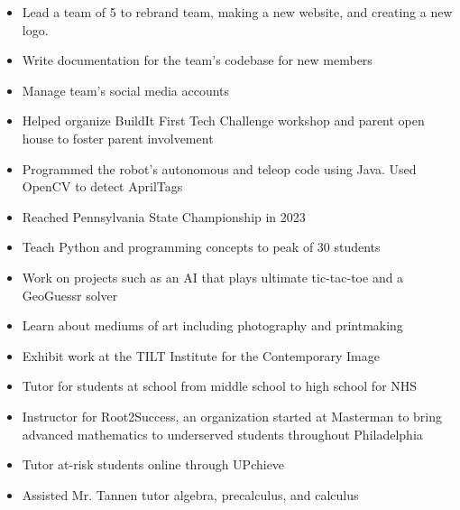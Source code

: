 \documentclass[9pt,letterpaper,ragged2e,withhyper]{altacv}
\begin{document}
\begin{paracol}{2}

\begin{itemize}
\item Lead a team of 5 to rebrand team, making a new website, and creating a new logo.
\item Write documentation for the team's codebase for new members
\item Manage team's social media accounts
\item Helped organize BuildIt First Tech Challenge workshop and parent open house to foster parent involvement
\item Programmed the robot's autonomous and teleop code using Java. Used OpenCV to detect AprilTags
\item Reached Pennsylvania State Championship in 2023
\end{itemize}

\divider

\begin{itemize}
\item Teach Python and programming concepts to peak of 30 students
\item Work on projects such as an AI that plays ultimate tic-tac-toe and a GeoGuessr solver
\end{itemize}

\divider

\begin{itemize}
\item Learn about mediums of art including photography and printmaking
\item Exhibit work at the TILT Institute for the Contemporary Image
\end{itemize}

\divider

\begin{itemize}
\item Tutor for students at school from middle school to high school for NHS
\item Instructor for Root2Success, an organization started at Masterman to bring advanced mathematics to underserved students throughout Philadelphia
\item Tutor at-risk students online through UPchieve
\item Assisted Mr. Tannen tutor algebra, precalculus, and calculus
\end{itemize}


\end{paracol}
\end{document}
